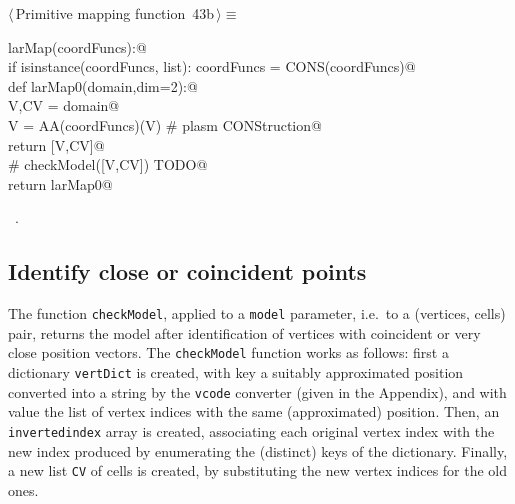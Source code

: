 \documentclass[11pt,oneside]{article}    %
\begin{document}
\begin{flushleft} \small \label{scrap71}
\protect{}$\langle\,$Primitive mapping function\nobreak\ {\footnotesize 43b}$\,\rangle\equiv$
\vspace{-1ex}
\begin{list}{}{} \item
\mbox{}\verb@def larMap(coordFuncs):@\\
\mbox{}\verb@    if isinstance(coordFuncs, list): coordFuncs = CONS(coordFuncs)@\\
\mbox{}\verb@    def larMap0(domain,dim=2):@\\
\mbox{}\verb@        V,CV = domain@\\
\mbox{}\verb@        V = AA(coordFuncs)(V)  # plasm CONStruction@\\
\mbox{}\verb@        return [V,CV]@\\
\mbox{}\verb@        # checkModel([V,CV])  TODO@\\
\mbox{}\verb@    return larMap0@\\
\mbox{}\verb@@{\NWsep}
\end{list}
\vspace{-1ex}
\footnotesize\addtolength{\baselineskip}{-1ex}
\begin{list}{}{\setlength{\itemsep}{-\parsep}\setlength{\itemindent}{-\leftmargin}}
\item \NWtxtMacroRefIn\ .
\end{list}
\end{flushleft}

\subsection{Identify close or coincident points}

The function \texttt{checkModel}, applied to a \texttt{model} parameter, i.e.~to a (vertices, cells)  pair, returns the model after identification of vertices with coincident or very close position vectors.
The \texttt{checkModel} function works as follows: first a dictionary \texttt{vertDict} is created, with key a suitably approximated position converted into a string by the \texttt{vcode} converter (given in the Appendix), and with value the list of vertex indices with the same (approximated) position. Then, an \texttt{invertedindex} array is created, associating each original vertex index with the new index produced by enumerating the (distinct) keys of the dictionary. Finally, a new list \texttt{CV} of cells is created, by substituting the new vertex indices for the old ones. 
\end{document}
